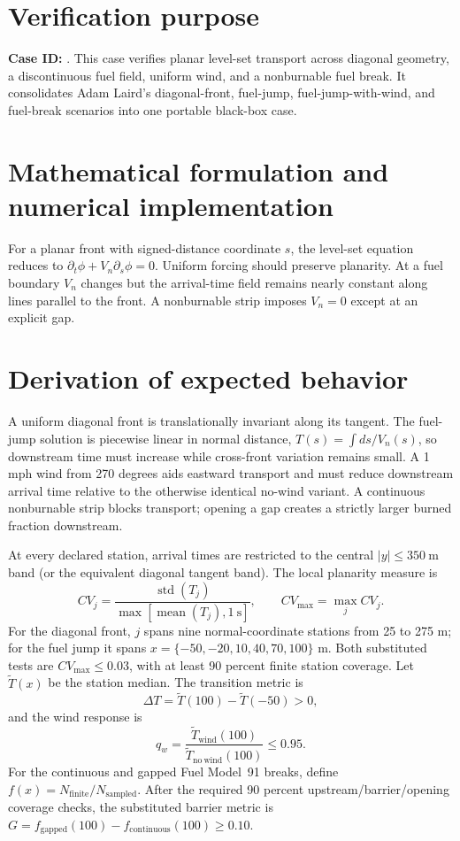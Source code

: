 \section{Verification purpose}

\textbf{Case ID:} \texttt{\CaseID}. This case verifies planar level-set transport across diagonal geometry, a discontinuous fuel field, uniform wind, and a nonburnable fuel break. It consolidates Adam Laird's diagonal-front, fuel-jump, fuel-jump-with-wind, and fuel-break scenarios into one portable black-box case.

\section{Mathematical formulation and numerical implementation}

For a planar front with signed-distance coordinate $s$, the level-set equation reduces to $\partial_t\phi+V_n\partial_s\phi=0$. Uniform forcing should preserve planarity. At a fuel boundary $V_n$ changes but the arrival-time field remains nearly constant along lines parallel to the front. A nonburnable strip imposes $V_n=0$ except at an explicit gap.

\section{Derivation of expected behavior}

A uniform diagonal front is translationally invariant along its tangent. The fuel-jump solution is piecewise linear in normal distance, $T(s)=\int ds/V_n(s)$, so downstream time must increase while cross-front variation remains small. A 1 mph wind from 270 degrees aids eastward transport and must reduce downstream arrival time relative to the otherwise identical no-wind variant. A continuous nonburnable strip blocks transport; opening a gap creates a strictly larger burned fraction downstream.

At every declared station, arrival times are restricted to the central
\(|y|\leq350~\mathrm{m}\) band (or the equivalent diagonal tangent band).
The local planarity measure is
\[
 CV_j=\frac{\operatorname{std}(T_j)}
            {\max[\operatorname{mean}(T_j),1~\mathrm{s}]},
 \qquad CV_{\max}=\max_jCV_j.
\]
For the diagonal front, \(j\) spans nine normal-coordinate stations from
25 to 275 m; for the fuel jump it spans
\(x=\{-50,-20,10,40,70,100\}\) m.  Both substituted tests are
\(CV_{\max}\leq0.03\), with at least 90 percent finite station coverage.
Let \(\widetilde T(x)\) be the station median.  The transition metric is
\[
 \Delta T=\widetilde T(100)-\widetilde T(-50)>0,
\]
and the wind response is
\[
 q_w=\frac{\widetilde T_{\mathrm{wind}}(100)}
           {\widetilde T_{\mathrm{no\ wind}}(100)}\leq0.95.
\]
For the continuous and gapped Fuel Model~91 breaks, define
\(f(x)=N_{\mathrm{finite}}/N_{\mathrm{sampled}}\).  After the required
90 percent upstream/barrier/opening coverage checks, the substituted
barrier metric is
\(G=f_{\mathrm{gapped}}(100)-f_{\mathrm{continuous}}(100)\geq0.10\).

